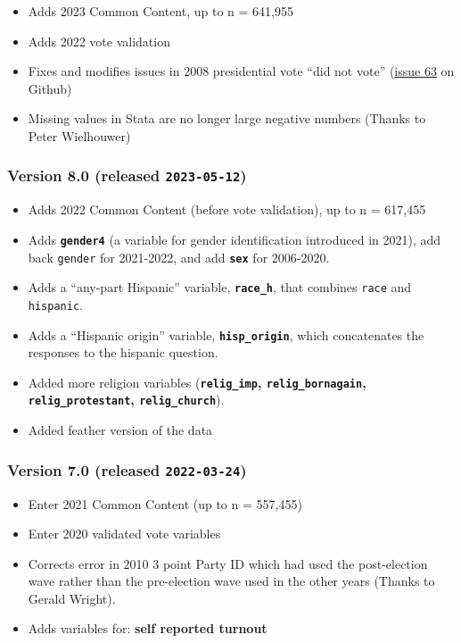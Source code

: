 \documentclass[10pt,article,oneside]{memoir}
\begin{document}
\begin{itemize}
\tightlist
\item
  Adds 2023 Common Content, up to n = 641,955
\item
  Adds 2022 vote validation
\item
  Fixes and modifies issues in 2008 presidential vote ``did not vote''
  (\href{https://github.com/kuriwaki/cces_cumulative/issues/63}{issue
  63} on Github)
\item
  Missing values in Stata are no longer large negative numbers (Thanks
  to Peter Wielhouwer)
\end{itemize}

\subsubsection{\texorpdfstring{Version 8.0 (released
\texttt{2023-05-12})}{Version 8.0 (released 2023-05-12)}}\label{version-8.0-released-2023-05-12}

\begin{itemize}
\tightlist
\item
  Adds 2022 Common Content (before vote validation), up to n = 617,455
\item
  Adds \textbf{\texttt{gender4}} (a variable for gender identification
  introduced in 2021), add back \texttt{gender} for 2021-2022, and add
  \textbf{\texttt{sex}} for 2006-2020.
\item
  Adds a ``any-part Hispanic'' variable, \textbf{\texttt{race\_h}}, that
  combines \texttt{race} and \texttt{hispanic}.
\item
  Adds a ``Hispanic origin'' variable, \textbf{\texttt{hisp\_origin}},
  which concatenates the responses to the hispanic question.
\item
  Added more religion variables (\textbf{\texttt{relig\_imp},
  \texttt{relig\_bornagain}, \texttt{relig\_protestant},
  \texttt{relig\_church}}).
\item
  Added feather version of the data
\end{itemize}

\subsubsection{\texorpdfstring{Version 7.0 (released
\texttt{2022-03-24})}{Version 7.0 (released 2022-03-24)}}\label{version-7.0-released-2022-03-24}

\begin{itemize}
\tightlist
\item
  Enter 2021 Common Content (up to n = 557,455)
\item
  Enter 2020 validated vote variables
\item
  Corrects error in 2010 3 point Party ID which had used the
  post-election wave rather than the pre-election wave used in the other
  years (Thanks to Gerald Wright).
\item
  Adds variables for: \textbf{self reported turnout}
\end{itemize}
\end{document}

